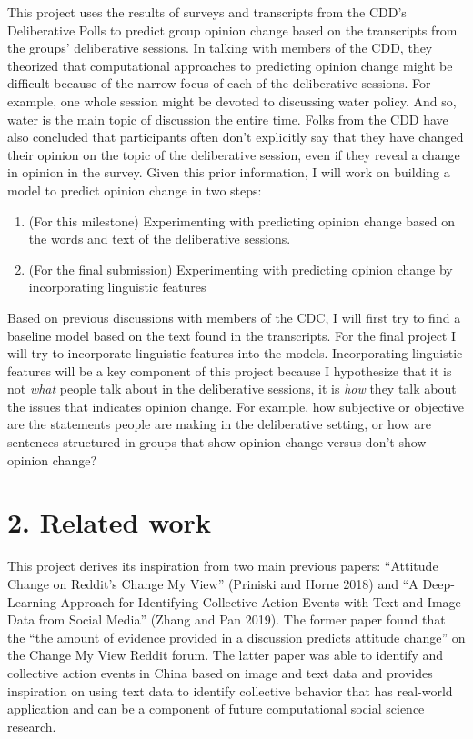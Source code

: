 \documentclass[12pt,]{article}
\providecommand{\tightlist}{%
\setlength{\itemsep}{0pt}\setlength{\parskip}{0pt}}
\begin{document}
This project uses the results of surveys and transcripts from the CDD's
Deliberative Polls to predict group opinion change based on the
transcripts from the groups' deliberative sessions. In talking with
members of the CDD, they theorized that computational approaches to
predicting opinion change might be difficult because of the narrow focus
of each of the deliberative sessions. For example, one whole session
might be devoted to discussing water policy. And so, water is the main
topic of discussion the entire time. Folks from the CDD have also
concluded that participants often don't explicitly say that they have
changed their opinion on the topic of the deliberative session, even if
they reveal a change in opinion in the survey. Given this prior
information, I will work on building a model to predict opinion change
in two steps:

\begin{enumerate}
\def\labelenumi{\arabic{enumi}.}
\tightlist
\item
  (For this milestone) Experimenting with predicting opinion change
  based on the words and text of the deliberative sessions.
\item
  (For the final submission) Experimenting with predicting opinion
  change by incorporating linguistic features
\end{enumerate}

Based on previous discussions with members of the CDC, I will first try
to find a baseline model based on the text found in the transcripts. For
the final project I will try to incorporate linguistic features into the
models. Incorporating linguistic features will be a key component of
this project because I hypothesize that it is not \emph{what} people
talk about in the deliberative sessions, it is \emph{how} they talk
about the issues that indicates opinion change. For example, how
subjective or objective are the statements people are making in the
deliberative setting, or how are sentences structured in groups that
show opinion change versus don't show opinion change?

\hypertarget{related-work}{%
\section{2. Related work}\label{related-work}}

This project derives its inspiration from two main previous papers:
``Attitude Change on Reddit's Change My View'' (Priniski and Horne 2018)
and ``A Deep-Learning Approach for Identifying Collective Action Events
with Text and Image Data from Social Media'' (Zhang and Pan 2019). The
former paper found that the ``the amount of evidence provided in a
discussion predicts attitude change'' on the Change My View Reddit
forum. The latter paper was able to identify and collective action
events in China based on image and text data and provides inspiration on
using text data to identify collective behavior that has real-world
application and can be a component of future computational social
science research.
\end{document}
